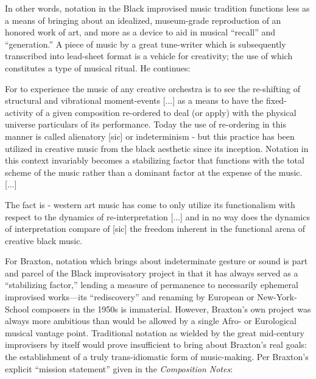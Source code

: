     \noindent In other words, notation in the Black improvised music tradition functions less as a means of bringing about an idealized, museum-grade reproduction of an honored work of art, and more as a device to aid in musical ``recall'' and ``generation.'' A piece of music by a great tune-writer which is subsequently transcribed into lead-sheet format is a vehicle for creativity; the use of which constitutes a type of musical ritual. He continues:

    \begin{smallquote}
            \noindent For to experience the music of any creative orchestra is to see the re-shifting of structural and vibrational moment-events [...] as a means to have the fixed-activity of a given composition re-ordered to deal (or apply) with the physical universe particulars of its performance. Today the use of re-ordering in this manner is called alienatory [sic] or indeterminism - but this practice has been utilized in creative music from the black aesthetic since its inception. Notation in this context invariably becomes a stabilizing factor that functions with the total scheme of the music rather than a dominant factor at the expense of the music. [...]

            \vspace{7pt}
            
            \noindent The fact is - western art music has come to only utilize its functionalism with respect to the dynamics of re-interpretation [...] and in no way does the dynamics of interpretation compare of [sic] the freedom inherent in the functional arena of creative black music.\autocite[35--7]{Braxton_1985}
        \end{smallquote}

    \noindent For Braxton, notation which brings about indeterminate gesture or sound is part and parcel of the Black improvisatory project in that it has always served as a ``stabilizing factor,'' lending a measure of permanence to necessarily ephemeral improvised works---its ``rediscovery'' and renaming by European or New-York-School composers in the 1950s is immaterial. However, Braxton's own project was always more ambitious than would be allowed by a single Afro- or Eurological musical vantage point. Traditional notation as wielded by the great mid-century improvisers by itself would prove insufficient to bring about Braxton's real goals: the establishment of a truly trans-idiomatic form of music-making. Per Braxton's explicit ``mission statement'' given in the \textit{Composition Notes}:


